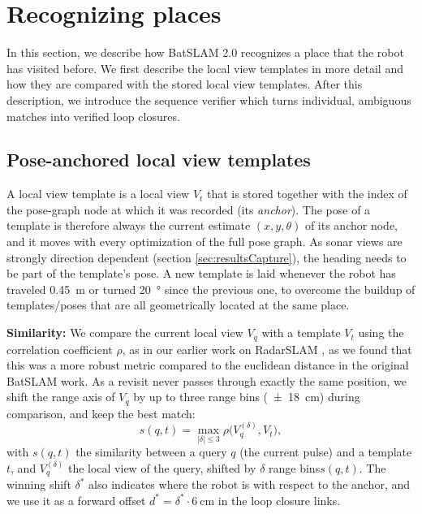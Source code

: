 \section{Recognizing places}
\label{sec:recognition}
In this section, we describe how BatSLAM 2.0 recognizes a place that the robot has visited before. We first describe the local view templates in more detail and how they are compared with the stored local view templates. After this description, we introduce the sequence verifier which turns individual, ambiguous matches into verified loop closures.

\subsection{Pose-anchored local view templates}
\label{sec:templates}
A local view template is a local view $V_t$ that is stored together with the index of the pose-graph node at which it was recorded (its \emph{anchor}). The pose of a template is therefore always the current estimate $(x, y, \theta)$ of its anchor node, and it moves with every optimization of the full pose graph. As sonar views are strongly direction dependent (section \ref{sec:resultsCapture}), the heading needs to be part of the template's pose. A new template is laid whenever the robot has traveled \SI{0.45}{\meter} or turned \SI{20}{\degree} since the previous one, to overcome the buildup of templates/poses that are all geometrically located at the same place.

\textbf{Similarity:} We compare the current local view $V_q$ with a template $V_t$ using the correlation coefficient $\rho$, as in our earlier work on RadarSLAM \cite{schoutenBiomimeticRadarSystem2019}, as we found that this was a more robust metric compared to the euclidean distance in the original BatSLAM work. As a revisit never passes through exactly the same position, we shift the range axis of $V_q$ by up to three range bins (\SI{\pm 18}{\centi\meter}) during comparison, and keep the best match:
\begin{equation}
s(q,t) = \max_{|\delta| \le 3} \rho\big( V_q^{(\delta)}, V_t \big),
\label{eq:similarity}
\end{equation}
%
with $s(q,t)$ the similarity between a query $q$ (the current pulse) and a template $t$, and $V_q^{(\delta)}$ the local view of the query, shifted by $\delta$ range bins$s(q,t)$. The winning shift $\delta^*$ also indicates where the robot is with respect to the anchor, and we use it as a forward offset $d^* = \delta^* \cdot \SI{6}{\centi\meter}$ in the loop closure links.

